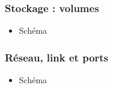   \begin{frame}
    \frametitle{Stockage : volumes}
    \begin{itemize}
      \item Schéma
    \end{itemize}
  \end{frame}

  \begin{frame}
    \frametitle{Réseau, link et ports}
    \begin{itemize}
      \item Schéma
    \end{itemize}
  \end{frame}
